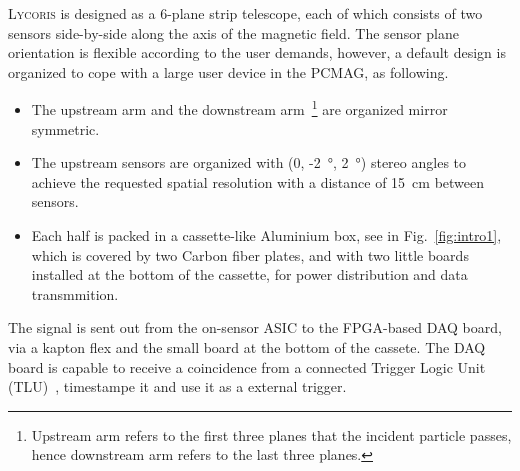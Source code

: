 \documentclass[conference]{IEEEtran}
\def\lycoris{\textsc{Lycoris }}%
\begin{document}
\lycoris is designed as a 6-plane strip telescope, each of which consists of two sensors side-by-side along the axis of the magnetic field.
The sensor plane orientation is flexible according to the user demands, however, a default design is organized to cope with a large user device in the PCMAG, as following.
\begin{itemize}
  \item The upstream arm and the downstream arm~\footnote{Upstream arm refers to the first three planes that the incident particle passes, hence downstream arm refers to the last three planes.} are organized mirror symmetric.
  \item The upstream sensors are organized with (0, -\SI{2}{\degree}, \SI{2}{\degree}) stereo angles to achieve the requested spatial resolution with a distance of \SI{15}{cm} between sensors.
  \item Each half is packed in a cassette-like Aluminium box, see in Fig.~\ref{fig:intro1}, which is covered by two Carbon fiber plates, and with two little boards installed at the bottom of the cassette, for power distribution and data transmmition.
\end{itemize}

The signal is sent out from the on-sensor ASIC to the FPGA-based DAQ board, via a kapton flex and the small board at the bottom of the cassete.
The DAQ board is capable to receive a coincidence from a connected Trigger Logic Unit (TLU)~\cite{tlu}, timestampe it and use it as a external trigger.

\end{document}
